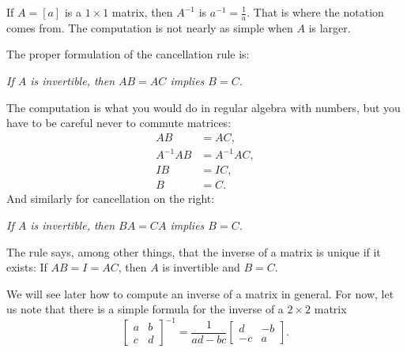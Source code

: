 \documentclass{ximera}
\begin{document}
If $A = [a]$ is a $1 \times 1$ matrix, then $A^{-1}$ is $a^{-1} = \frac{1}{a}$.  That is where the notation comes from.  The computation is not nearly as simple when $A$ is larger.


The proper formulation of the cancellation rule is:
\begin{center}
    \emph{If $A$ is invertible, then $AB = AC$ implies $B=C$.}
\end{center}
The computation is what you would do in regular algebra with numbers, but you have to be careful never to commute matrices:
\begin{align*}
    AB & = AC , \\
    A^{-1}AB & = A^{-1}AC , \\
    IB & = IC , \\
    B & = C .
\end{align*}
And similarly for cancellation on the right:
\begin{center}
    \emph{If $A$ is invertible, then $BA = CA$ implies $B=C$.}
\end{center}

The rule says, among other things, that the inverse of a matrix is unique if it exists:  If $AB = I = AC$, then $A$ is invertible and $B=C$.

We will see later how to compute an inverse of a matrix in general.  For now, let us note that there is a simple formula for the inverse of a $2 \times 2$ matrix
\begin{equation*}
    \begin{bmatrix}
        a & b \\
        c & d
    \end{bmatrix}^{-1}
    = \frac{1}{ad-bc}
    \begin{bmatrix}
        d & -b \\
        -c & a
    \end{bmatrix} .
\end{equation*}
\end{document}
